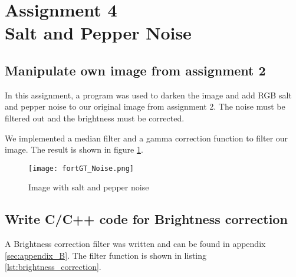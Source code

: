 \section {Assignment 4 \\ {Salt and Pepper Noise}}
\label {sec:assignment_4}

\subsection{Manipulate own image from assignment 2}

In this assignment, a program was used to darken the image and add RGB salt and pepper noise to our original image from assignment 2. The noise must be filtered out and the brightness must be corrected.

We implemented a median filter and a gamma correction function to filter our image. The result is shown in figure \ref{fig:fortGT_Noise}.

\begin{figure}[h!]
    \centering
    \texttt{[image: fortGT\_Noise.png]}
    \caption{Image with salt and pepper noise}
    \label{fig:fortGT_Noise}
\end{figure}

\subsection{Write C/C++ code for Brightness correction}

A Brightness correction filter was written and can be found in appendix \ref{sec:appendix_B}. The filter function is shown in listing \ref{lst:brightness_correction}.

